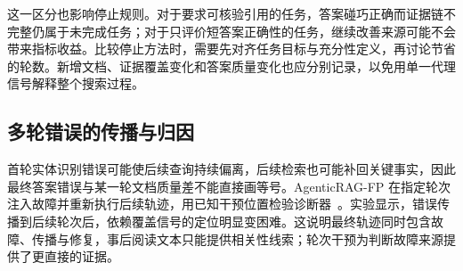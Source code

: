 这一区分也影响停止规则。对于要求可核验引用的任务，答案碰巧正确而证据链不完整仍属于未完成任务；对于只评价短答案正确性的任务，继续改善来源可能不会带来指标收益。比较停止方法时，需要先对齐任务目标与充分性定义，再讨论节省的轮数。新增文档、证据覆盖变化和答案质量变化也应分别记录，以免用单一代理信号解释整个搜索过程。

\subsection{多轮错误的传播与归因}

首轮实体识别错误可能使后续查询持续偏离，后续检索也可能补回关键事实，因此最终答案错误与某一轮文档质量差不能直接画等号。AgenticRAG-FP 在指定轮次注入故障并重新执行后续轨迹，用已知干预位置检验诊断器~\citep{pothuru2026failures}。实验显示，错误传播到后续轮次后，依赖覆盖信号的定位明显变困难。这说明最终轨迹同时包含故障、传播与修复，事后阅读文本只能提供相关性线索；轮次干预为判断故障来源提供了更直接的证据。
